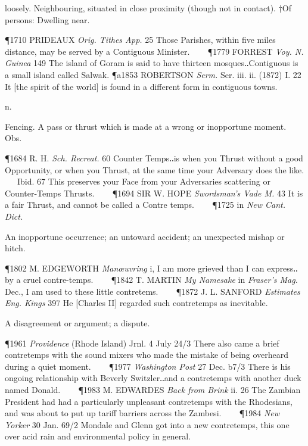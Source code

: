 \begin{description}[wide, labelwidth=!, labelindent=0pt]
\begin{myenumerate}
 loosely. Neighbouring, situated in close proximity (though not in contact). †Of persons: Dwelling near.

\P 1710 PRIDEAUX  \textit{Orig. Tithes App.} 25 Those Parishes, within five miles distance, may be served by a Contiguous Minister.    
\P 1779 FORREST  \textit{Voy. N. Guinea} 149 The island of Goram is said to have thirteen mosques‥Contiguous is a small island called Salwak.
\P a1853 ROBERTSON  \textit{Serm.} Ser. iii. ii. (1872) I. 22 It [the spirit of the world] is found in a different form in contiguous towns.
\end{myenumerate}


 n.

\noindent {}

\vspace{-0.3cm}

\begin{myenumerate}

 Fencing. A pass or thrust which is made at a wrong or inopportune moment. Obs.

\P 1684 R. H. \textit{Sch.  Recreat.} 60 Counter Temps‥is when you Thrust without a good Opportunity, or when you Thrust, at the same time your Adversary does the like.    Ibid. 67 This preserves your Face from your Adversaries scattering or Counter-Temps Thrusts.    
\P 1694 SIR W. HOPE  \textit{Swordsman's Vade M.} 43 It is a fair Thrust, and cannot be called a Contre temps.    
\P 1725 in  \textit{New Cant. Dict.}

 An inopportune occurrence; an untoward accident; an unexpected mishap or hitch.

\P 1802 M. EDGEWORTH  \textit{Manœuvring} i, I am more grieved than I can express‥by a cruel contre-temps.    
\P 1842 T. MARTIN  \textit{My Namesake} in \textit{Fraser's Mag.} Dec., I am used to these little contretems.    
\P 1872 J. L. SANFORD  \textit{Estimates Eng. Kings} 397 He [Charles II] regarded such contretemps as inevitable.

 A disagreement or argument; a dispute.

\P 1961 \textit{Providence}  (Rhode Island) Jrnl. 4 July 24/3 There also came a brief contretemps with the sound mixers who made the mistake of being overheard during a quiet moment.    
\P 1977  \textit{Washington Post} 27 Dec. b7/3 There is his ongoing relationship with Beverly Switzler‥and a contretemps with another duck named Donald.    
\P 1983 M. EDWARDES  \textit{Back from Brink} ii. 26 The Zambian President had had a particularly unpleasant contretemps with the Rhodesians, and was about to put up tariff barriers across the Zambesi.    
\P 1984  \textit{New Yorker} 30 Jan. 69/2 Mondale and Glenn got into a new contretemps, this one over acid rain and environmental policy in general.


\end{myenumerate}
\end{description}

